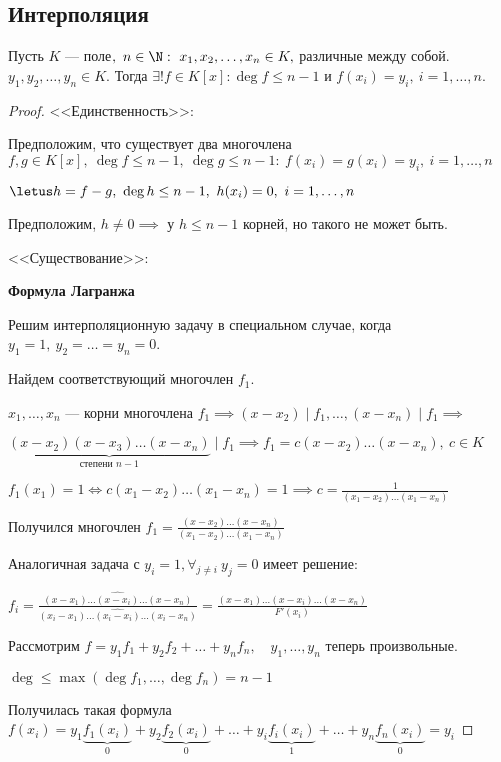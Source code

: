 \subsection{Интерполяция}

\begin{theorem}
    Пусть $K$ --- поле$,~ n \in \N:~ x_1, x_2, \ldots, x_n \in K,$ различные между собой. $y_1, y_2, \ldots, y_n \in K$. Тогда $\exists! f \in K[x]: \deg f \leq n - 1$ и $f(x_i) = y_i,~i = 1, \ldots, n$.
\end{theorem}

\begin{proof}

    <<Единственность>>:

    Предположим, что существует два многочлена $f, g \in K[x],~\deg f \leq n - 1,~\deg g \leq n - 1:~ f(x_i) = g(x_i) = y_i,~i = 1, \ldots, n$

    $\letus h = f - g,~\deg h \leq n - 1,~h(x_i) = 0,~i = 1, \ldots, n$

    Предположим, $h \neq 0 \implies$ у $h \leq n - 1$ корней, но такого не может быть.

    <<Существование>>:

    \textbf{Формула Лагранжа}

    Решим интерполяционную задачу в специальном случае, когда $y_1 = 1,~ y_2 = \ldots = y_n = 0$.

    Найдем соответствующий многочлен $f_1$.

    $x_1, \ldots, x_n$ --- корни многочлена $f_1 \implies (x - x_2) \mid f_1, \ldots, (x - x_n) \mid f_1 \implies$ 

    $\underbrace{(x - x_2) (x - x_3) \ldots (x - x_n)}_{\text{степени } n - 1} \mid f_1 \implies f_1 = c(x - x_2) \ldots (x - x_n),~c \in K$

    $f_1 (x_1) = 1 \iff c (x_1 - x_2) \ldots (x_1 - x_n) = 1 \implies c = \frac{1}{(x_1 - x_2) \ldots (x_1 - x_n)}$

    Получился многочлен $f_1 = \frac{(x - x_2) \ldots (x - x_n)}{(x_1 - x_2) \ldots (x_1 - x_n)}$

    Аналогичная задача с $y_i = 1, \forall_{j \neq i}~y_j = 0$ имеет решение:

    $f_i = \frac{(x - x_1) \ldots \widehat{(x - x_i)} \ldots (x - x_n)}{(x_i - x_1) \ldots \widehat{(x_i - x_i)} \ldots (x_i - x_n)} = \frac{(x - x_1) \ldots \widehat{(x - x_i)} \ldots (x - x_n)}{F'(x_i)}$

    Рассмотрим $f = y_1 f_1 + y_2 f_2 + \ldots + y_n f_n,\quad y_1, \ldots, y_n$ теперь произвольные.

    $\deg \leq \max(\deg f_1, \ldots, \deg f_n) = n - 1$

    Получилась такая формула $f(x_i) = y_1 \underbrace{f_1(x_i)}_0 + y_2 \underbrace{f_2(x_i)}_0 + \ldots + y_i \underbrace{f_i(x_i)}_1 + \ldots + y_n \underbrace{f_n(x_i)}_0 = y_i$

\end{proof}

